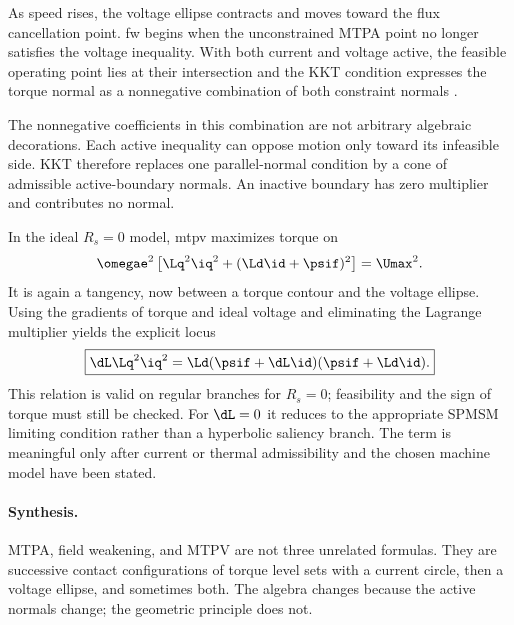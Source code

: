 As speed rises, the voltage ellipse contracts and moves toward the flux
cancellation point.  \gls{fw} begins when the unconstrained MTPA point no
longer satisfies the voltage inequality.  With both current and voltage active,
the feasible operating point lies at their intersection and the KKT condition
expresses the torque normal as a nonnegative combination of both constraint
normals \cite{boyd2004}.

The nonnegative coefficients in this combination are not arbitrary algebraic
decorations.  Each active inequality can oppose motion only toward its
infeasible side.  KKT therefore replaces one parallel-normal condition by a
cone of admissible active-boundary normals.  An inactive boundary has zero
multiplier and contributes no normal.

In the ideal $R_s=0$ model, \gls{mtpv} maximizes torque on
\begin{equation}
 \omegae^2\left[\Lq^2\iq^2+(\Ld\id+\psif)^2\right]=\Umax^2.
\end{equation}
It is again a tangency, now between a torque contour and the voltage ellipse.
Using the gradients of torque and ideal voltage and eliminating the Lagrange
multiplier yields the explicit locus
\begin{equation}
 \boxed{\dL\Lq^2\iq^2
 =\Ld(\psif+\dL\id)(\psif+\Ld\id).}\label{eq:ideal-mtpv}
\end{equation}
This relation is valid on regular branches for $R_s=0$; feasibility and the
sign of torque must still be checked.  For $\dL=0$ it reduces to the appropriate
SPMSM limiting condition rather than a hyperbolic saliency branch.
The term is meaningful only after current or thermal admissibility and the
chosen machine model have been stated.



\paragraph{Synthesis.}
MTPA, field weakening, and MTPV are not three unrelated formulas.  They are
successive contact configurations of torque level sets with a current circle,
then a voltage ellipse, and sometimes both.  The algebra changes because the
active normals change; the geometric principle does not.
